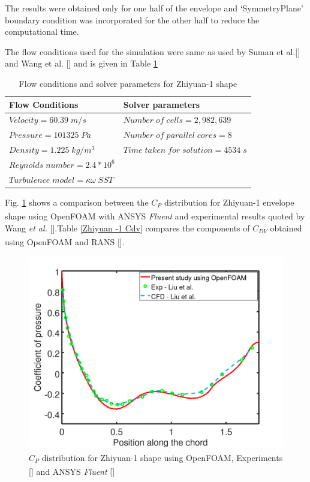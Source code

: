 The results were obtained only for one half of the envelope and `SymmetryPlane' boundary condition was incorporated for the other half to reduce the computational time.

The flow conditions used for the simulation were same as used by Suman et al.[] and Wang et al. [] and is given in Table \ref{Flow conditions and solver parametres for Zhiyuan-1 shape}

\begin{table}[H]
	\caption{Flow conditions and solver parameters for Zhiyuan-1 shape}
	\label{Flow conditions and solver parametres for Zhiyuan-1 shape}
	\centering
	\begin{tabular}{ll}
		\hline \hline
		Flow Conditions & Solver parameters  \\ \hline \hline
		
		$ Velocity = 60.39 \; m/s$ & $Number \; of \; cells = 2,982,639$    \\  
		$ Pressure = 101325 \; Pa $ & $ Number \; of \; parallel \; cores = 8 $     \\
		$ Density = 1.225 \; kg/m^{3} $ & $ Time \; taken \; for \; solution = 4534 \; s  $    \\
		$ Reynolds \; number = 2.4 * 10^{6} $ &    \\
		$ Turbulence \; model = \kappa \omega \; SST $ &     \\
		\hline
	\end{tabular}
\end{table}


Fig. \ref{Zhiyuan_OF_RANS} shows a comparison between the $C_{P}$ distribution for Zhiyuan-1 envelope shape using  OpenFOAM\textsuperscript{\textregistered} with ANSYS\textsuperscript{\textregistered} \textit{Fluent} and experimental results quoted by Wang \textit{et al.} [].Table \ref{Zhiyuan -1 Cdv} compares the components of $C_{DV}$ obtained using OpenFOAM\textsuperscript{\textregistered} and RANS [].
\begin{figure}[H]
	\centering
	\includegraphics[width=270 pt]{rnd/zhiyuan_cp.png}
	\caption{$C_{P}$ distribution for Zhiyuan-1 shape using OpenFOAM\textsuperscript{\textregistered}, Experiments [] and ANSYS\textsuperscript{\textregistered} \textit{Fluent} []}
	\label{Zhiyuan_OF_RANS} %
\end{figure}

